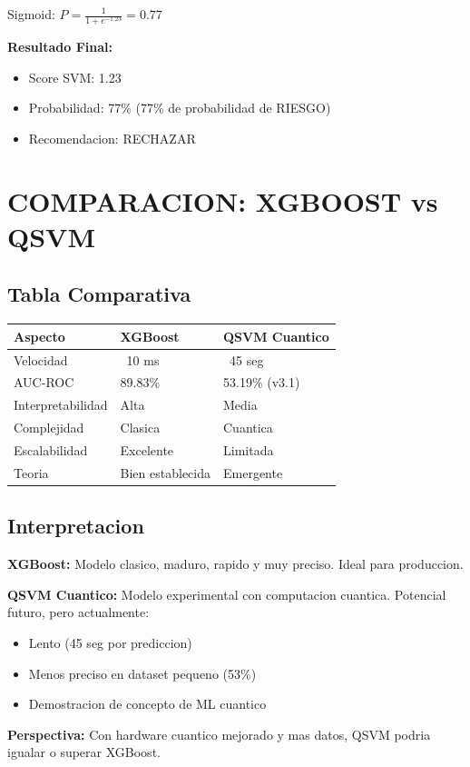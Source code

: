 \documentclass[11pt]{article}
\begin{document}
Sigmoid: $P = \frac{1}{1 + e^{-1.23}} = 0.77$

\textbf{Resultado Final:}
\begin{itemize}
\item Score SVM: 1.23
\item Probabilidad: 77\% (77\% de probabilidad de RIESGO)
\item Recomendacion: RECHAZAR
\end{itemize}

\section*{COMPARACION: XGBOOST vs QSVM}

\subsection*{Tabla Comparativa}

\begin{tabular}{|l|l|l|}
\hline
\textbf{Aspecto} & \textbf{XGBoost} & \textbf{QSVM Cuantico} \\
\hline
Velocidad & ~10 ms & ~45 seg \\
AUC-ROC & 89.83\% & 53.19\% (v3.1) \\
Interpretabilidad & Alta & Media \\
Complejidad & Clasica & Cuantica \\
Escalabilidad & Excelente & Limitada \\
Teoria & Bien establecida & Emergente \\
\hline
\end{tabular}

\subsection*{Interpretacion}

\textbf{XGBoost:} Modelo clasico, maduro, rapido y muy preciso. Ideal para produccion.

\textbf{QSVM Cuantico:} Modelo experimental con computacion cuantica. Potencial futuro, pero actualmente:
\begin{itemize}
\item Lento (45 seg por prediccion)
\item Menos preciso en dataset pequeno (53\%)
\item Demostracion de concepto de ML cuantico
\end{itemize}

\textbf{Perspectiva:} Con hardware cuantico mejorado y mas datos, QSVM podria igualar o superar XGBoost.
\end{document}
